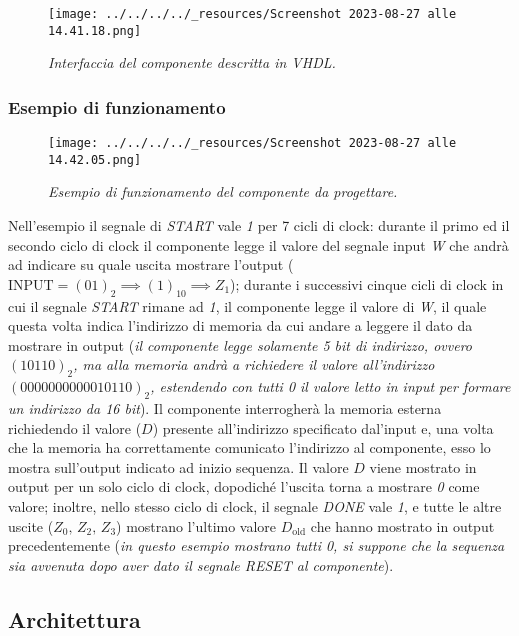 \begin{figure}
\centering
\texttt{[image: ../../../../\_resources/Screenshot 2023-08-27 alle 14.41.18.png]}
\caption{\emph{Interfaccia del componente descritta in VHDL.}}
\end{figure}

\pagebreak

\hypertarget{esempio-di-funzionamento}{%
\subsubsection{Esempio di
funzionamento}\label{esempio-di-funzionamento}}

\begin{figure}
\centering
\texttt{[image: ../../../../\_resources/Screenshot 2023-08-27 alle 14.42.05.png]}
\caption{\emph{Esempio di funzionamento del componente da progettare.}}
\end{figure}

Nell'esempio il segnale di \emph{START} vale \emph{1} per 7 cicli di
clock: durante il primo ed il secondo ciclo di clock il componente legge
il valore del segnale input \emph{W} che andrà ad indicare su quale
uscita mostrare l'output
(\(\text{INPUT}=(01)_2\implies(1)_{10}\implies Z_1\)); durante i
successivi cinque cicli di clock in cui il segnale \emph{START} rimane
ad \emph{1}, il componente legge il valore di \emph{W}, il quale questa
volta indica l'indirizzo di memoria da cui andare a leggere il dato da
mostrare in output (\emph{il componente legge solamente 5 bit di
indirizzo, ovvero \((10110)_2\), ma alla memoria andrà a richiedere il
valore all'indirizzo \((0000000000010110)_2\), estendendo con tutti 0 il
valore letto in input per formare un indirizzo da 16 bit}). Il
componente interrogherà la memoria esterna richiedendo il valore (\(D\))
presente all'indirizzo specificato dal'input e, una volta che la memoria
ha correttamente comunicato l'indirizzo al componente, esso lo mostra
sull'output indicato ad inizio sequenza. Il valore \(D\) viene mostrato
in output per un solo ciclo di clock, dopodiché l'uscita torna a
mostrare \emph{0} come valore; inoltre, nello stesso ciclo di clock, il
segnale \emph{DONE} vale \emph{1}, e tutte le altre uscite
(\(Z_0,\,Z_2,\,Z_3\)) mostrano l'ultimo valore \(D_\text{old}\) che
hanno mostrato in output precedentemente (\emph{in questo esempio
mostrano tutti 0, si suppone che la sequenza sia avvenuta dopo aver dato
il segnale RESET al componente}).

\pagebreak

\hypertarget{architettura}{%
\subsection{Architettura}\label{architettura}}

